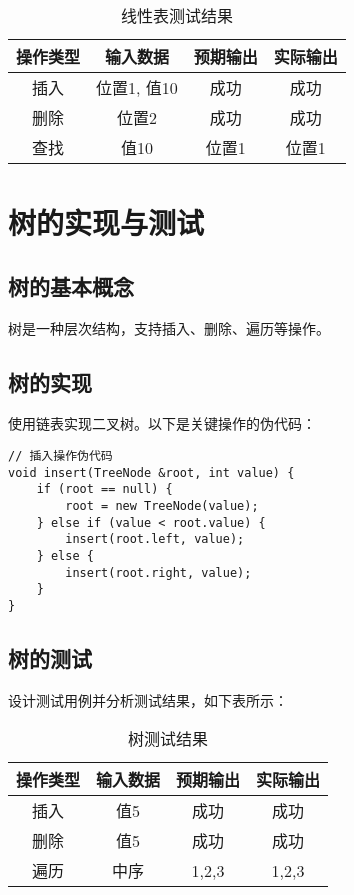 \documentclass{article}
\begin{document}
\begin{table}
\centering
\begin{tabular}{|c|c|c|c|}
\hline
操作类型 & 输入数据 & 预期输出 & 实际输出 \\ \hline
插入 & 位置1, 值10 & 成功 & 成功 \\ \hline
删除 & 位置2 & 成功 & 成功 \\ \hline
查找 & 值10 & 位置1 & 位置1 \\ \hline
\end{tabular}
\caption{线性表测试结果}
\label{tab:linear_table_test}
\end{table}

\section{树的实现与测试}
\subsection{树的基本概念}
树是一种层次结构，支持插入、删除、遍历等操作。

\subsection{树的实现}
使用链表实现二叉树。以下是关键操作的伪代码：

\begin{verbatim}
// 插入操作伪代码
void insert(TreeNode &root, int value) {
    if (root == null) {
        root = new TreeNode(value);
    } else if (value < root.value) {
        insert(root.left, value);
    } else {
        insert(root.right, value);
    }
}
\end{verbatim}

\subsection{树的测试}
设计测试用例并分析测试结果，如下表所示：

\begin{table}
\centering
\begin{tabular}{|c|c|c|c|}
\hline
操作类型 & 输入数据 & 预期输出 & 实际输出 \\ \hline
插入 & 值5 & 成功 & 成功 \\ \hline
删除 & 值5 & 成功 & 成功 \\ \hline
遍历 & 中序 & 1,2,3 & 1,2,3 \\ \hline
\end{tabular}
\caption{树测试结果}
\label{tab:tree_test}
\end{table}
\end{document}
